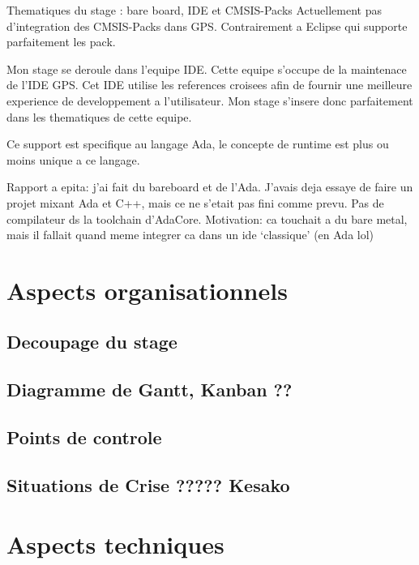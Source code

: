 \documentclass[11pt,]{article}
\begin{document}
Thematiques du stage : bare board, IDE et CMSIS-Packs Actuellement pas
d'integration des CMSIS-Packs dans GPS. Contrairement a Eclipse qui
supporte parfaitement les pack.

Mon stage se deroule dans l'equipe IDE. Cette equipe s'occupe de la
maintenace de l'IDE GPS. Cet IDE utilise les references croisees afin de
fournir une meilleure experience de developpement a l'utilisateur. Mon
stage s'insere donc parfaitement dans les thematiques de cette equipe.

Ce support est specifique au langage Ada, le concepte de runtime est
plus ou moins unique a ce langage.

Rapport a epita: j'ai fait du bareboard et de l'Ada. J'avais deja essaye
de faire un projet mixant Ada et C++, mais ce ne s'etait pas fini comme
prevu. Pas de compilateur ds la toolchain d'AdaCore. Motivation: ca
touchait a du bare metal, mais il fallait quand meme integrer ca dans un
ide `classique' (en Ada lol)

\section{Aspects organisationnels}\label{aspects-organisationnels}

\subsection{Decoupage du stage}\label{decoupage-du-stage}

\subsection{Diagramme de Gantt, Kanban
??}\label{diagramme-de-gantt-kanban}

\subsection{Points de controle}\label{points-de-controle}

\subsection{Situations de Crise ?????
Kesako}\label{situations-de-crise-kesako}

\section{Aspects techniques}\label{aspects-techniques}
\end{document}
